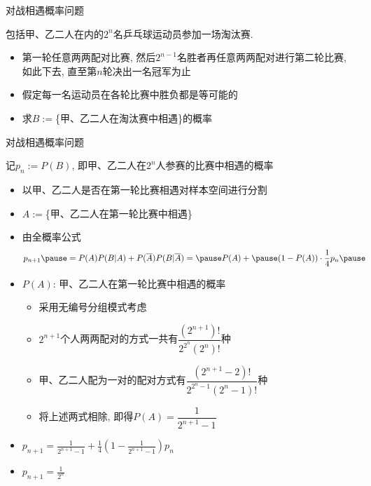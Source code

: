 \begin{frame}{对战相遇概率问题}
	\begin{exam}
		包括甲、乙二人在内的$2^n$名乒乓球运动员参加一场淘汰赛.
		\begin{itemize}[<+-|alert@+>]
			\item 第一轮任意两两配对比赛, 然后$2^{n-1}$名胜者再任意两两配对进行第二轮比赛, 如此下去, 直至第$n$轮决出一名冠军为止
			\item 假定每一名运动员在各轮比赛中胜负都是等可能的
			\item 求$B:=$\{甲、乙二人在淘汰赛中相遇\}的概率
		\end{itemize}
	\end{exam}


\end{frame}
\begin{frame}{对战相遇概率问题}
		\begin{jieda}
		记$p_n:=P(B)$, 即甲、乙二人在$2^n$人参赛的比赛中相遇的概率%
		\begin{itemize}[<+-|alert@+>]
			\item 以甲、乙二人是否在第一轮比赛相遇对样本空间进行分割
			\item $A:=$\{甲、乙二人在第一轮比赛中相遇\}
			\item 由全概率公式
			\begin{align*}
				p_{n+1}\pause &=P(A)P(B|A)+P(\overline{A})P(B|\overline{A})=\pause P(A)+\pause (1-P(A))\cdot \dfrac{1}{4}p_n\pause
			\end{align*}
			\item $P(A)$: 甲、乙二人在第一轮比赛中相遇的概率
			\begin{itemize}[<+-|alert@+>]
				\item 采用无编号分组模式考虑
				\item $2^{n+1}$个人两两配对的方式一共有$\dfrac{(2^{n+1})!}{2^{2^n}(2^n)!}$种
				\item 甲、乙二人配为一对的配对方式有$\dfrac{(2^{n+1}-2)!}{2^{2^n-1}(2^n-1)!}$种
				\item 将上述两式相除, 即得$P(A)=\dfrac{1}{2^{n+1}-1}$%
			\end{itemize}
		\item 	$p_{n+1}=\frac{1}{2^{n+1}-1}+\frac{1}{4}(1-\frac{1}{2^{n+1}-1})p_n$
		\item $p_{n+1}=\frac{1}{2^n}$
		\end{itemize}
%
%
	\end{jieda}
\end{frame}








